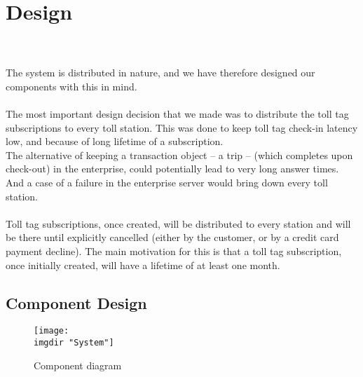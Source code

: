 \chapter{Design}
\anna \piotr \kim \\\\
\label{sec:design}
\noindent
The system is distributed in nature, and we have therefore designed our components with this in mind.\\\\
The most important design decision that we made was to distribute the toll tag subscriptions to every toll station. This was done to keep toll tag check-in latency low, and because of long lifetime of a subscription.\\
The alternative of keeping a transaction object -- a trip -- (which completes upon check-out) in the enterprise, could potentially lead to very long answer times. And a case of a failure in the enterprise server would bring down every toll station.\\\\
Toll tag subscriptions, once created, will be distributed to every station and will be there until explicitly cancelled (either by the customer, or by a credit card payment decline). The main motivation for this is that a toll tag subscription, once initially created, will have a lifetime of at least one month.
\section{Component Design}

\begin{figure}
  \centering
  \texttt{[image: \\imgdir "System"]}
  \caption{Component diagram}
  \label{fig:component_diagram}
\end{figure}

